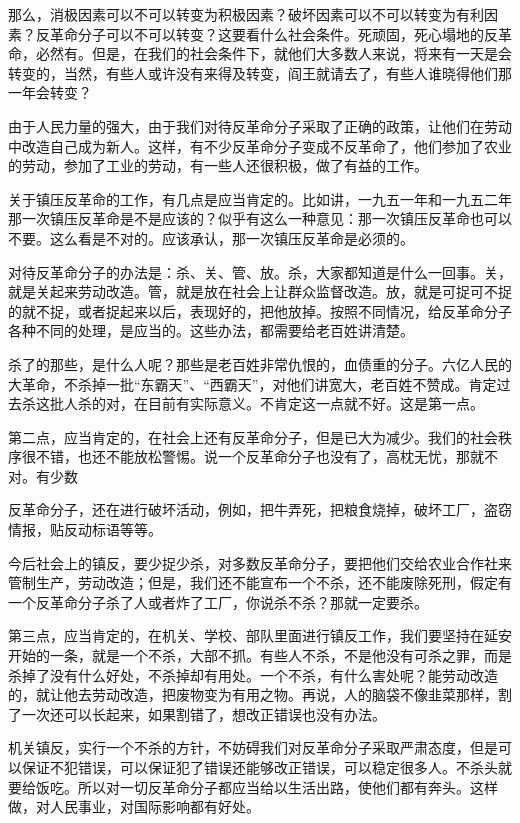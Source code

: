 那么，消极因素可以不可以转变为积极因素？破坏因素可以不可以转变为有利因素？反革命分子可以不可以转变？这要看什么社会条件。死顽固，死心塌地的反革命，必然有。但是，在我们的社会条件下，就他们大多数人来说，将来有一天是会转变的，当然，有些人或许没有来得及转变，阎王就请去了，有些人谁晓得他们那一年会转变？

由于人民力量的强大，由于我们对待反革命分子采取了正确的政策，让他们在劳动中改造自己成为新人。这样，有不少反革命分子变成不反革命了，他们参加了农业的劳动，参加了工业的劳动，有一些人还很积极，做了有益的工作。

关于镇压反革命的工作，有几点是应当肯定的。比如讲，一九五一年和一九五二年那一次镇压反革命是不是应该的？似乎有这么一种意见：那一次镇压反革命也可以不要。这么看是不对的。应该承认，那一次镇压反革命是必须的。

对待反革命分子的办法是：杀、关、管、放。杀，大家都知道是什么一回事。关，就是关起来劳动改造。管，就是放在社会上让群众监督改造。放，就是可捉可不捉的就不捉，或者捉起来以后，表现好的，把他放掉。按照不同情况，给反革命分子各种不同的处理，是应当的。这些办法，都需要给老百姓讲清楚。

杀了的那些，是什么人呢？那些是老百姓非常仇恨的，血债重的分子。六亿人民的大革命，不杀掉一批“东霸天”、“西霸天”，对他们讲宽大，老百姓不赞成。肯定过去杀这批人杀的对，在目前有实际意义。不肯定这一点就不好。这是第一点。

第二点，应当肯定的，在社会上还有反革命分子，但是已大为减少。我们的社会秩序很不错，也还不能放松警惕。说一个反革命分子也没有了，高枕无忧，那就不对。有少数

反革命分子，还在进行破坏活动，例如，把牛弄死，把粮食烧掉，破坏工厂，盗窃情报，贴反动标语等等。

今后社会上的镇反，要少捉少杀，对多数反革命分子，要把他们交给农业合作社来管制生产，劳动改造；但是，我们还不能宣布一个不杀，还不能废除死刑，假定有一个反革命分子杀了人或者炸了工厂，你说杀不杀？那就一定要杀。

第三点，应当肯定的，在机关、学校、部队里面进行镇反工作，我们要坚持在延安开始的一条，就是一个不杀，大部不抓。有些人不杀，不是他没有可杀之罪，而是杀掉了没有什么好处，不杀掉却有用处。一个不杀，有什么害处呢？能劳动改造的，就让他去劳动改造，把废物变为有用之物。再说，人的脑袋不像韭菜那样，割了一次还可以长起来，如果割错了，想改正错误也没有办法。

机关镇反，实行一个不杀的方针，不妨碍我们对反革命分子采取严肃态度，但是可以保证不犯错误，可以保证犯了错误还能够改正错误，可以稳定很多人。不杀头就要给饭吃。所以对一切反革命分子都应当给以生活出路，使他们都有奔头。这样做，对人民事业，对国际影响都有好处。


